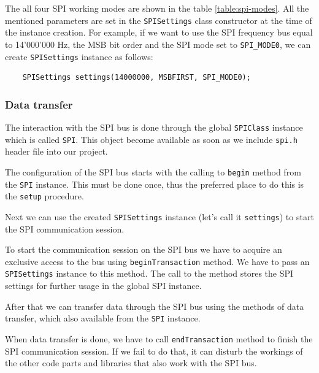 \documentclass[../sparc.tex]{subfiles}
\begin{document}
The all four SPI working modes are shown in the table \ref{table:spi-modes}.
All the mentioned parameters are set in the \texttt{SPISettings} class
constructor at the time of the instance creation.  For example, if we want to
use the SPI frequency bus equal to 14'000'000 Hz, the MSB bit order and the SPI
mode set to \texttt{SPI_MODE0}, we can create
\texttt{SPISettings} instance as follows:

\begin{listing}[H]
  \begin{verbatim}
    SPISettings settings(14000000, MSBFIRST, SPI_MODE0);
  \end{verbatim}
  \label{listing:communication-spi-settings}
  \caption{Creation of \texttt{SPISettings} with the required
    parameters.}
\end{listing}

\subsubsection{Data transfer}

The interaction with the SPI bus is done through the global
\texttt{SPIClass} instance which is called \texttt{SPI}.  This
object become available as soon as we include \texttt{spi.h} header
file into our project.

The configuration of the SPI bus starts with the calling to
\texttt{begin} method from the \texttt{SPI} instance.  This
must be done once, thus the preferred place to do this is the
\texttt{setup} procedure.

Next we can use the created \texttt{SPISettings} instance (let's call
it \texttt{settings}) to start the SPI communication session.

To start the communication session on the SPI bus we have to acquire an
exclusive access to the bus using \texttt{beginTransaction} method.  We
have to pass an \texttt{SPISettings} instance to this method.  The call
to the method stores the SPI settings for further usage in the global SPI
instance.

After that we can transfer data through the SPI bus using the methods of data
transfer, which also available from the \texttt{SPI} instance.

When data transfer is done, we have to call \texttt{endTransaction}
method to finish the SPI communication session.  If we fail to do that, it can
disturb the workings of the other code parts and libraries that also work with
the SPI bus.
\end{document}

